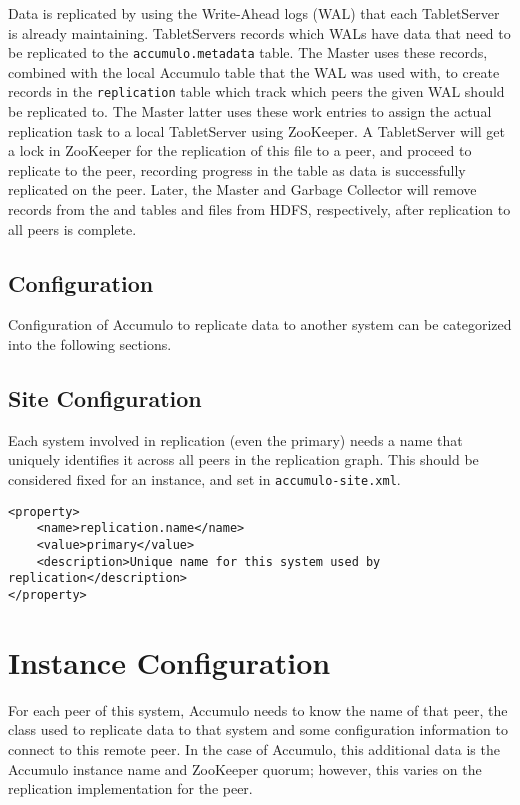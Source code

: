 Data is replicated by using the Write-Ahead logs (WAL) that each TabletServer is
already maintaining. TabletServers records which WALs have data that need to be
replicated to the \texttt{accumulo.metadata} table. The Master uses these records,
combined with the local Accumulo table that the WAL was used with, to create records
in the \texttt{replication} table which track which peers the given WAL should be
replicated to. The Master latter uses these work entries to assign the actual
replication task to a local TabletServer using ZooKeeper. A TabletServer will get
a lock in ZooKeeper for the replication of this file to a peer, and proceed to
replicate to the peer, recording progress in the  table as
data is successfully replicated on the peer. Later, the Master and Garbage Collector
will remove records from the  and  tables
and files from HDFS, respectively, after replication to all peers is complete.

\subsection{Configuration}

Configuration of Accumulo to replicate data to another system can be categorized
into the following sections.

\subsection{Site Configuration}

Each system involved in replication (even the primary) needs a name that uniquely
identifies it across all peers in the replication graph. This should be considered
fixed for an instance, and set in \texttt{accumulo-site.xml}.

\begingroup\fontsize{8pt}{8pt}\selectfont\begin{verbatim}
<property>
    <name>replication.name</name>
    <value>primary</value>
    <description>Unique name for this system used by replication</description>
</property>
\end{verbatim}\endgroup

\section{Instance Configuration}

For each peer of this system, Accumulo needs to know the name of that peer,
the class used to replicate data to that system and some configuration information
to connect to this remote peer. In the case of Accumulo, this additional data
is the Accumulo instance name and ZooKeeper quorum; however, this varies on the
replication implementation for the peer.

